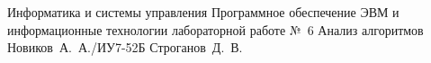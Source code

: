 \documentclass{bmstu}
\begin{document}
\makereporttitle
    {Информатика и системы управления}
    {Программное обеспечение ЭВМ и информационные технологии}
    {лабораторной работе №~6}
    {Анализ алгоритмов}
    {}
    {}
    {Новиков~А.~А./ИУ7-52Б}
    {Строганов~Д.~В.}

\renewcommand{\contentsname}{СОДЕРЖАНИЕ} 
\tableofcontents
\setcounter{page}{2}







\makebibliography
\end{document}
